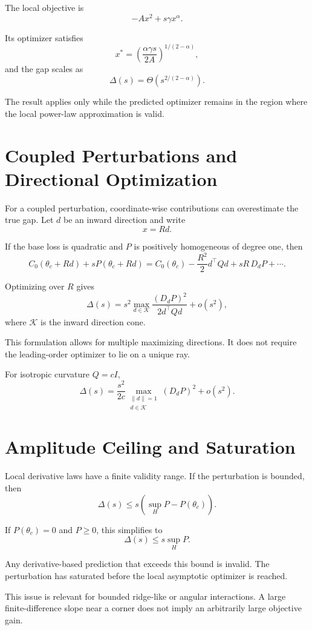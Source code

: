 \documentclass[11pt]{article}
\theoremstyle{remark}
\begin{document}
The local objective is
\[
-Ax^2+s\gamma x^\alpha.
\]

Its optimizer satisfies
\[
x^*
=
\left(\frac{\alpha\gamma s}{2A}\right)^{1/(2-\alpha)},
\]
and the gap scales as
\[
\Delta(s)
=
\Theta\left(s^{2/(2-\alpha)}\right).
\]

The result applies only while the predicted optimizer remains in the region
where the local power-law approximation is valid.

\section{Coupled Perturbations and Directional Optimization}

For a coupled perturbation, coordinate-wise contributions can overestimate the
true gap. Let $d$ be an inward direction and write
\[
x=Rd.
\]

If the base loss is quadratic and $P$ is positively homogeneous of degree one,
then
\[
C_0(\theta_c+Rd)+sP(\theta_c+Rd)
=
C_0(\theta_c)
-\frac{R^2}{2}d^\top Qd
+sR\,D_dP+\cdots.
\]

Optimizing over $R$ gives
\[
\Delta(s)
=
s^2
\max_{d\in\mathcal K}
\frac{(D_dP)^2}{2d^\top Qd}
+o(s^2),
\]
where $\mathcal K$ is the inward direction cone.

This formulation allows for multiple maximizing directions. It does not require
the leading-order optimizer to lie on a unique ray.

For isotropic curvature $Q=cI$,
\[
\Delta(s)
=
\frac{s^2}{2c}
\max_{\substack{\|d\|=1\\d\in\mathcal K}}
(D_dP)^2
+o(s^2).
\]

\section{Amplitude Ceiling and Saturation}

Local derivative laws have a finite validity range. If the perturbation is
bounded, then
\[
\Delta(s)
\leq
s\left(\sup_H P-P(\theta_c)\right).
\]

If $P(\theta_c)=0$ and $P\geq0$, this simplifies to
\[
\Delta(s)\leq s\sup_H P.
\]

Any derivative-based prediction that exceeds this bound is invalid. The
perturbation has saturated before the local asymptotic optimizer is reached.

This issue is relevant for bounded ridge-like or angular interactions. A large
finite-difference slope near a corner does not imply an arbitrarily large
objective gain.
\end{document}
